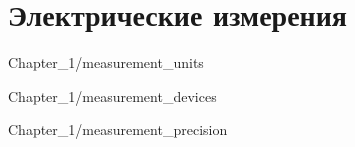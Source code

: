 \chapter{Электрические измерения}


 {Chapter_1/measurement_units}

 {Chapter_1/measurement_devices}

 {Chapter_1/measurement_precision}

\newpage





